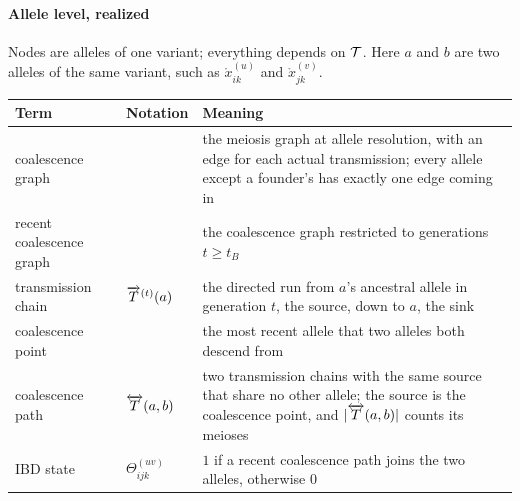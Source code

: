 \documentclass[12pt]{article}
\numberwithin{equation}{section}
\begin{document}
\paragraph{Allele level, realized} Nodes are alleles of one variant; everything depends on $\mathcal{T}$.
Here $a$ and $b$ are two alleles of the same variant, such as $\mathring{x}_{ik}^{(u)}$ and $\mathring{x}_{jk}^{(v)}$.
\begingroup
\footnotesize
\renewcommand{\arraystretch}{1.15}
\begin{longtable}{>{\raggedright\arraybackslash}p{3.0cm} l >{\raggedright\arraybackslash}p{8.4cm}}
    \textbf{Term} & \textbf{Notation} & \textbf{Meaning} \\
    \hline
    \endhead
    coalescence graph & & the meiosis graph at allele resolution, with an edge for each actual transmission; every allele except a founder's has exactly one edge coming in \\
    recent coalescence graph & & the coalescence graph restricted to generations $t \geq t_B$ \\
    transmission chain & $\overrightarrow{T}^{(t)}(a)$ & the directed run from $a$'s ancestral allele in generation $t$, the source, down to $a$, the sink \\
    coalescence point & & the most recent allele that two alleles both descend from \\
    coalescence path & $\overleftrightarrow{T}(a,b)$ & two transmission chains with the same source that share no other allele; the source is the coalescence point, and $|\overleftrightarrow{T}(a,b)|$ counts its meioses \\
    IBD state & $\Theta^{(uv)}_{ijk}$ & $1$ if a recent coalescence path joins the two alleles, otherwise $0$ \\
\end{longtable}
\endgroup
\end{document}
